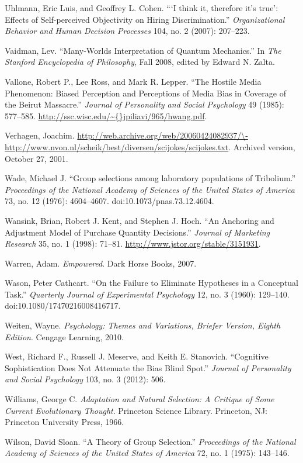 \documentclass[letterpaper]{book}
\begin{document}
{
 Uhlmann, Eric Luis, and Geoffrey L. Cohen.
```I think it, therefore
it's true': Effects of Self-perceived
Objectivity on Hiring Discrimination.''
\textit{Organizational Behavior and Human Decision Processes} 104, no.
2 (2007): 207--223.}

{
 Vaidman, Lev. ``Many-Worlds Interpretation of
Quantum Mechanics.'' In \textit{The Stanford
Encyclopedia of Philosophy}, Fall 2008, edited by Edward N. Zalta.}

{
 Vallone, Robert P., Lee Ross, and Mark R. Lepper.
``The Hostile Media Phenomenon: Biased Perception and
Perceptions of Media Bias in Coverage of the Beirut
Massacre.'' \textit{Journal of Personality and Social
Psychology} 49 (1985): 577--585.
\url{http://ssc.wisc.edu/\~{}jpiliavi/965/hwang.pdf}.}

{
 Verhagen, Joachim.
\url{http://web.archive.org/web/20060424082937/\-http://www.nvon.nl/scheik/best/diversen/scijokes/scijokes.txt}.
Archived version, October 27, 2001.}

{
 Wade, Michael J. ``Group selections among
laboratory populations of Tribolium.''
\textit{Proceedings of the National Academy of Sciences of the United
States of America} 73, no. 12 (1976): 4604--4607.
doi:10.1073/pnas.73.12.4604.}

{
 Wansink, Brian, Robert J. Kent, and Stephen J. Hoch.
``An Anchoring and Adjustment Model of Purchase
Quantity Decisions.'' \textit{Journal of Marketing
Research} 35, no. 1 (1998): 71--81.
\url{http://www.jstor.org/stable/3151931}.}

{
 Warren, Adam. \textit{Empowered}. Dark Horse Books, 2007.}

{
 Wason, Peter Cathcart. ``On the Failure to
Eliminate Hypotheses in a Conceptual Task.''
\textit{Quarterly Journal of Experimental Psychology} 12, no. 3 (1960):
129--140. doi:10.1080/17470216008416717.}

{
 Weiten, Wayne. \textit{Psychology: Themes and Variations, Briefer
Version, Eighth Edition}. Cengage Learning, 2010.}

{
 West, Richard F., Russell J. Meserve, and Keith E. Stanovich.
``Cognitive Sophistication Does Not Attenuate the Bias
Blind Spot.'' \textit{Journal of Personality and
Social Psychology} 103, no. 3 (2012): 506.}

{
 Williams, George C. \textit{Adaptation and Natural Selection: A
Critique of Some Current Evolutionary Thought}. Princeton Science
Library. Princeton, NJ: Princeton University Press, 1966.}

{
 Wilson, David Sloan. ``A Theory of Group
Selection.'' \textit{Proceedings of the National
Academy of Sciences of the United States of America} 72, no. 1 (1975):
143--146.}
\end{document}
